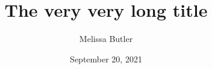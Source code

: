 \documentclass{beamer}
\title[Short title]{The very very long title}
\author[Melissa Butler]{Melissa Butler}
\institute[UWyo]{University of Wyoming}
\date{September 20, 2021}
\begin{document}
\begin{frame}
\maketitle
\end{frame}


\end{document}
